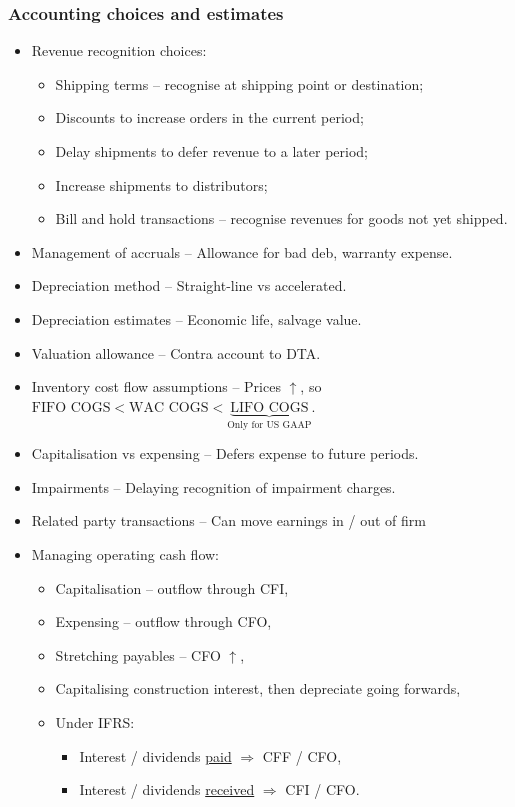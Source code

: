 \documentclass[../notes_compiled.tex]{subfiles}
\begin{document}
\subsubsection{Accounting choices and estimates}
\begin{itemize}
\item Revenue recognition choices:
\begin{itemize}
\item Shipping terms -- recognise at shipping point or destination;
\item Discounts to increase orders in the current period;
\item Delay shipments to defer revenue to a later period;
\item Increase shipments to distributors;
\item Bill and hold transactions -- recognise revenues for goods not yet shipped.
\end{itemize}

\item Management of accruals -- Allowance for bad deb, warranty expense.

\item Depreciation method -- Straight-line vs accelerated.

\item Depreciation estimates -- Economic life, salvage value.

\item Valuation allowance -- Contra account to DTA.

\item Inventory cost flow assumptions -- Prices $\uparrow$, so $\text{FIFO COGS} < \text{WAC COGS} < \underbrace{\text{LIFO COGS}}_{\text{Only for US GAAP}}$.

\item Capitalisation vs expensing -- Defers expense to future periods.

\item Impairments -- Delaying recognition of impairment charges.

\item Related party transactions -- Can move earnings in / out of firm

\item Managing operating cash flow:
\begin{itemize}
\item Capitalisation -- outflow through CFI,
\item Expensing -- outflow through CFO,
\item Stretching payables -- CFO $\uparrow$,
\item Capitalising construction interest, then depreciate going forwards,
\item Under IFRS:
\begin{itemize}
\item Interest / dividends \underline{paid} $\Rightarrow$ CFF / CFO,
\item Interest / dividends \underline{received} $\Rightarrow$ CFI / CFO.
\end{itemize}
\end{itemize}
\end{itemize}
\end{document}
